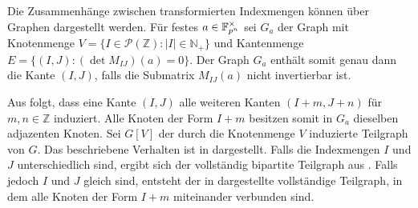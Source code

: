 \sloppy Die Zusammenhänge zwischen transformierten Indexmengen können über Graphen dargestellt werden. Für festes ${a \in \field{p}[n]^\times}$ sei $G_a$ der Graph mit Knotenmenge ${V=\{I \in\mathcal{P}(\mathbb{Z}) : |I| \in \mathbb{N}_+\}}$ und Kantenmenge $E = \{(I,J) : (\det M_{IJ})(a) = 0\}$. Der Graph $G_a$ enthält somit genau dann die Kante $(I,J)$, falls die Submatrix $M_{IJ}(a)$ nicht invertierbar ist.

Aus  folgt, dass eine Kante $(I,J)$ alle weiteren Kanten $(I+m,J+n)$ für ${m,n\in \mathbb{Z}}$ induziert. Alle Knoten der Form $I+m$ besitzen somit in $G_a$ dieselben adjazenten Knoten. Sei $G[V]$ der durch die Knotenmenge $V$ induzierte Teilgraph von $G$. Das beschriebene Verhalten ist in  dargestellt. Falls die Indexmengen $I$ und $J$ unterschiedlich sind, ergibt sich der vollständig bipartite Teilgraph aus . Falls jedoch $I$ und $J$ gleich sind, entsteht der in  dargestellte vollständige Teilgraph, in dem alle Knoten der Form $I+m$ miteinander verbunden sind. 

